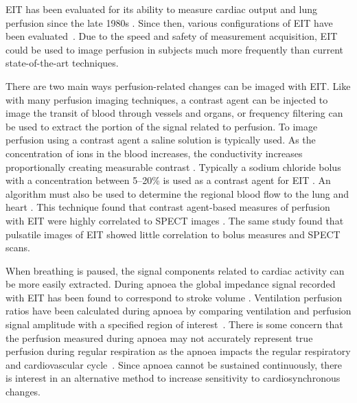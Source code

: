 EIT has been evaluated for its ability to measure cardiac output and
lung perfusion since the late 1980s
\parencite{eyuboglu_vivo_1989,zadehkoochak_pulmonary_1992,brown_blood_1992,frerichs_regional_2002}.
Since then, various configurations of EIT have been 
evaluated~\parencite{borges_regional_2012,nguyen_perfusion_2015}.
Due to the speed and safety of measurement acquisition, EIT could be used to image
perfusion in subjects much more frequently than current state-of-the-art techniques.

There are two main ways perfusion-related changes can be imaged with EIT. Like with many 
perfusion imaging techniques, a contrast agent can be injected to image the transit 
of blood through vessels and organs, or frequency filtering can be used to extract the portion 
of the signal related to perfusion.
To image perfusion using a contrast agent a saline solution is typically used.
As the concentration of ions in 
the blood increases, the conductivity increases proportionally
creating measurable contrast
\parencite{sola_non-invasive_2011}.
Typically a sodium chloride bolus with a concentration between 
5--20\% is used as a contrast agent for EIT \parencite{nguyen_review_2012}. 
An algorithm must also be used to determine the regional blood flow to the lung and heart
\parencite{borges_regional_2012}. This technique found that contrast agent-based 
measures of perfusion with EIT
were highly correlated to SPECT images
\parencite{borges_regional_2012}.
The same study found that pulsatile images of EIT showed little correlation to bolus measures 
and SPECT scans. 

When breathing is paused, the signal components related to 
cardiac activity can be more easily extracted. 
During apnoea the global impedance signal
recorded with EIT has been found to correspond to stroke volume
\parencite{fagerberg_electrical_2009}.
Ventilation perfusion ratios have been calculated during apnoea by comparing 
ventilation and perfusion signal amplitude with a specified region of 
interest~\parencite{fagerberg_electrical_2009}.
There is some concern that the perfusion measured 
during apnoea may not accurately represent 
true perfusion during regular respiration as the apnoea 
impacts the regular respiratory and cardiovascular cycle~\parencite{leonhardt_electrical_2012}.
Since 
apnoea cannot be sustained continuously, there is interest in an alternative method 
to increase sensitivity to cardiosynchronous changes. 

